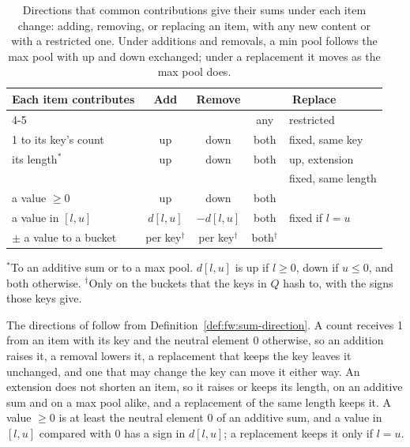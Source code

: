 \iffalse
\begin{table}[h]
  \caption{Directions that common contributions give their sums under each item change: adding, removing, or replacing an
  item, with any new content or with a restricted one. Under additions and removals, a min pool follows the max pool
  with up and down exchanged; under a replacement it moves as the max pool does.}
  \label{tab:fw:signs}
  \footnotesize
  \setlength{\tabcolsep}{4pt}
  \begin{tabular}{@{}lcccl@{}}
    \toprule
    Each item contributes & Add & Remove & \multicolumn{2}{c}{Replace} \\
    \cmidrule(l){4-5}
    & & & any & restricted \\
    \midrule
    1 to its key's count & up & down & both & fixed, same key \\
    its length$^{*}$ & up & down & both & up, extension \\
    & & & & fixed, same length \\
    a value $\ge 0$ & up & down & both & \\
    a value in $[l, u]$ & $d[l, u]$ & $-d[l, u]$ & both & fixed if $l = u$ \\
    $\pm$ a value to a bucket & per key$^{\dagger}$ & per key$^{\dagger}$ & both$^{\dagger}$ & \\
    \bottomrule
  \end{tabular}

  \smallskip
  \raggedright\footnotesize
  $^{*}$To an additive sum or to a max pool.
  $d[l, u]$ is up if $l \ge 0$, down if $u \le 0$, and both otherwise.
  $^{\dagger}$Only on the buckets that the keys in $Q$ hash to, with the signs those keys give.
\end{table}

The directions of  follow from Definition~\ref{def:fw:sum-direction}. A count receives 1 from an
item with its key and the neutral element $0$ otherwise, so an addition raises it, a removal lowers it, a replacement
that keeps the key leaves it unchanged, and one that may change the key can move it either way. An extension does not
shorten an item, so it raises or keeps its length, on an additive sum and on a max pool alike, and a replacement of the
same length keeps it. A value $\ge 0$ is at least the neutral element $0$ of an additive sum, and a value in $[l, u]$
compared with $0$ has a sign in $d[l, u]$; a replacement keeps it only if $l = u$.

